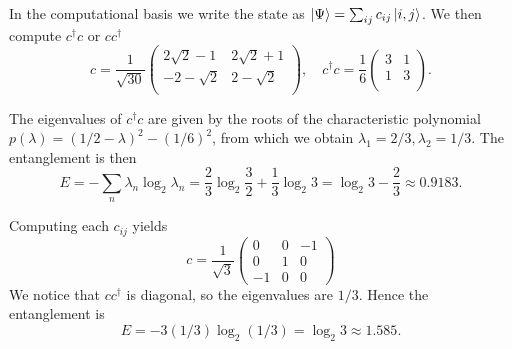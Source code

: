 \documentclass[a4paper,10pt,twoside]{article}
\begin{document}
\begin{section}{}
In the computational basis we write the state as $\ket{\Psi} = \sum_{ij} c_{ij} \ket{i,j}$. We then compute $c^\dag c$ or $cc^\dag$
\[
  c=\frac{1}{\sqrt{30}}
  \begin{pmatrix}
    2\sqrt{2} - 1 & 2\sqrt{2} + 1\\
    -2 - \sqrt{2} & 2 - \sqrt{2} \\
  \end{pmatrix},
  \quad
  c^\dag c=\frac{1}{6}
  \begin{pmatrix}
    3 & 1\\
    1 & 3\\
  \end{pmatrix}.
\]

The eigenvalues of $c^\dag c$ are given by the roots of the characteristic polynomial $p(\lambda) = (1/2 - \lambda)^2 - (1/6)^2$, from which we obtain $\lambda_1 = 2/3, \lambda_2 = 1/3$.
The entanglement is then
\[
  E = -\sum_n \lambda_n \log_2 \lambda_n = \frac{2}{3} \log_2{\frac{3}{2}} + \frac{1}{3} \log_2{3} = \log_2{3} - \frac{2}{3} \approx 0.9183 .
\]
\end{section}

\begin{section}{}
Computing each $c_{ij}$ yields
\[
  c=\frac{1}{\sqrt{3}}
  \begin{pmatrix}
    0 & 0 & -1\\
    0 & 1 & 0\\
    -1 & 0 & 0
  \end{pmatrix}
\]
We notice that $c c^\dag$ is diagonal, so the eigenvalues are $1/3$.
Hence the entanglement is 
\[
  E = -3(1/3)\log_2(1/3) = \log_2{3} \approx 1.585.
\]
\end{section}
\end{document}
